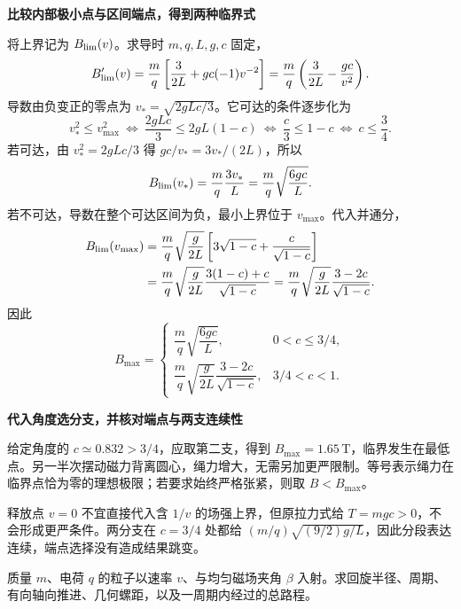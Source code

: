 \begin{solution}
\par\medskip{}\noindent\textbf{比较内部极小点与区间端点，得到两种临界式}\par\nobreak
将上界记为 $B_{\rm lim}(v)$。求导时 $m,q,L,g,c$ 固定，
\[
 B_{\rm lim}'(v)=\frac mq\left[\frac{3}{2L}+gc(-1)v^{-2}\right]
 =\frac mq\left(\frac{3}{2L}-\frac{gc}{v^2}\right).
\]
导数由负变正的零点为 $v_*=\sqrt{2gLc/3}$。它可达的条件逐步化为
\[
 v_*^2\le v_{\max}^2
 \ \Longleftrightarrow\ \frac{2gLc}{3}\le2gL(1-c)
 \ \Longleftrightarrow\ \frac c3\le1-c
 \ \Longleftrightarrow\ c\le\frac34.
\]
若可达，由 $v_*^2=2gLc/3$ 得 $gc/v_*=3v_*/(2L)$，所以
\[
 B_{\rm lim}(v_*)=\frac mq\frac{3v_*}{L}
 =\frac mq\sqrt{\frac{6gc}{L}}.
\]
若不可达，导数在整个可达区间为负，最小上界位于 $v_{\max}$。代入并通分，
\[
 \begin{aligned}
 B_{\rm lim}(v_{\max})
 &=\frac mq\sqrt{\frac g{2L}}
   \left[3\sqrt{1-c}+\frac c{\sqrt{1-c}}\right]\\
 &=\frac mq\sqrt{\frac g{2L}}\frac{3(1-c)+c}{\sqrt{1-c}}
 =\frac mq\sqrt{\frac g{2L}}\frac{3-2c}{\sqrt{1-c}}.
 \end{aligned}
\]
因此
\[
B_{\max}=\begin{cases}
\dfrac mq\sqrt{\dfrac{6gc}{L}},&0<c\le3/4,\\[1mm]
\dfrac mq\sqrt{\dfrac g{2L}}\dfrac{3-2c}{\sqrt{1-c}},&3/4<c<1.
\end{cases}
\]


\par\medskip{}\noindent\textbf{代入角度选分支，并核对端点与两支连续性}\par\nobreak
给定角度的 $c\simeq0.832>3/4$，应取第二支，得到 $B_{\max}=1.65\,\mathrm T$，临界发生在最低点。另一半次摆动磁力背离圆心，绳力增大，无需另加更严限制。等号表示绳力在临界点恰为零的理想极限；若要求始终严格张紧，则取 $B<B_{\max}$。

释放点 $v=0$ 不宜直接代入含 $1/v$ 的场强上界，但原拉力式给 $T=mgc>0$，不会形成更严条件。两分支在 $c=3/4$ 处都给 $(m/q)\sqrt{(9/2)g/L}$，因此分段表达连续，端点选择没有造成结果跳变。\end{solution}
\begin{question}\begin{example}[斜入射粒子的螺旋参数]\label{mg3:example:9}
质量 $m$、电荷 $q$ 的粒子以速率 $v$、与均匀磁场夹角 $\beta$ 入射。求回旋半径、周期、有向轴向推进、几何螺距，以及一周期内经过的总路程。
\end{example}
\end{question}
